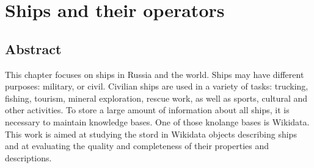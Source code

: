 \setchapterpreamble[u]{\margintoc}
\chapter{Ships and their operators}


\section{Abstract}

This chapter focuses on ships in Russia and the world. Ships may have different purposes: military, or civil. Civilian ships are used in a variety of tasks: trucking, fishing, tourism, mineral exploration, rescue work, as well as sports, cultural and other activities. To store a large amount of information about all ships, it is necessary to maintain knowledge bases. One of those knolange bases is Wikidata. This work is aimed at studying the stord in Wikidata objects describing ships and at evaluating the quality and completeness of their properties and descriptions.

